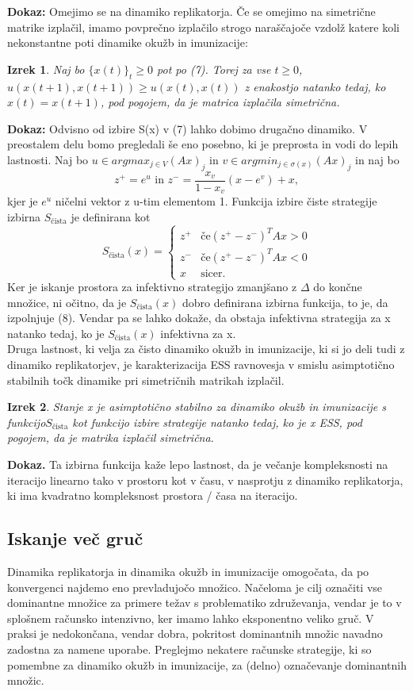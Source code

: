 \documentclass[a4paper]{article}
\newtheorem{theorem}{Izrek}
\begin{document}
\textbf{Dokaz:} Omejimo se na dinamiko replikatorja. Če se omejimo na simetrične matrike izplačil, imamo povprečno izplačilo strogo naraščajoče vzdolž katere koli nekonstantne poti dinamike okužb in imunizacije: 
\begin{theorem}
Naj bo $\{x(t)\}_t \geq 0$ pot po (7). Torej za vse $t \geq 0$, $u (x (t + 1), x (t + 1)) \geq u (x (t), x (t))$ z enakostjo natanko tedaj, ko $x (t) = x (t + 1)$, pod pogojem, da je matrica izplačila simetrična.
\end{theorem}
\textbf{Dokaz:} Odvisno od izbire S(x) v (7) lahko dobimo drugačno dinamiko. V preostalem delu bomo pregledali še eno posebno, ki je preprosta in vodi do lepih lastnosti. Naj bo $u \in arg max_{j \in V} (A x)_j$ in $v \in arg min_{j \in\sigma (x)} (A x)_j$ in naj bo
$$z^+ = e^u \text{ in } z^- = \frac{x_v}{1 - x_v} (x - e^v) + x, $$ kjer je $e^u$ ničelni vektor z u-tim elementom 1. Funkcija izbire čiste strategije izbirna $S_{\text{čista}}$ je definirana kot
$$ S_{\text{čista}}(x) = \begin{cases}
z^+ & \text{če} (z^+ - z^-)^T A x> 0\\
z^- & \text{če} (z^+ - z^-)^T A x <0\\
x & \text{sicer.}
\end{cases}$$
Ker je iskanje prostora za infektivno strategijo zmanjšano z $\Delta$ do končne množice, ni očitno, da je $S_{\text{čista}} (x)$ dobro definirana izbirna funkcija, to je, da izpolnjuje (8). Vendar pa se lahko dokaže, da obstaja infektivna strategija za x natanko tedaj, ko je $S_{\text{čista}} (x)$ infektivna za x.\\
Druga lastnost, ki velja za čisto dinamiko okužb in imunizacije, ki si jo deli tudi z dinamiko replikatorjev, je karakterizacija ESS ravnovesja v smislu asimptotično stabilnih točk dinamike pri simetričnih matrikah izplačil.
\begin{theorem} 
Stanje x je asimptotično stabilno za dinamiko okužb in imunizacije s funkcijo$S_{\text{čista}}$ kot funkcijo izbire strategije natanko tedaj, ko je x ESS, pod pogojem, da je matrika izplačil simetrična.
\end{theorem}
\textbf{Dokaz.} Ta izbirna funkcija kaže lepo lastnost, da je večanje kompleksnosti na iteracijo linearno tako v prostoru kot v času, v nasprotju z dinamiko replikatorja, ki ima kvadratno kompleksnost prostora / časa na iteracijo. 

\subsection{Iskanje več gruč}
Dinamika replikatorja in dinamika okužb in imunizacije omogočata, da po konvergenci najdemo eno prevladujočo množico. Načeloma je cilj označiti vse dominantne množice za primere težav s problematiko združevanja, vendar je to v splošnem računsko intenzivno, ker imamo lahko eksponentno veliko gruč. V praksi je nedokončana, vendar dobra, pokritost dominantnih množic navadno zadostna za namene uporabe. Preglejmo nekatere računske strategije, ki so pomembne za dinamiko okužb in imunizacije, za (delno) označevanje dominantnih množic.
\end{document}
